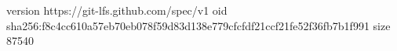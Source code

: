 version https://git-lfs.github.com/spec/v1
oid sha256:f8c4cc610a57eb70eb078f59d83d138e779cfcfdf21ccf21fe52f36fb7b1f991
size 87540
